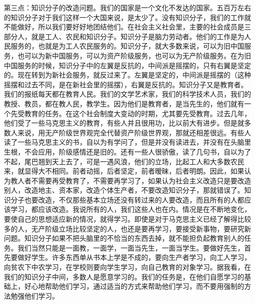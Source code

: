 第三点：知识分子的改造问题。我们的国家是一个文化不发达的国家。五百万左右的知识分子对于我们这样一个大国来说，是太少了。没有知识分子，我们的工作就不能做好，所以我们要好好地团结他们。在社会主义社会里，主要的社会成员是三部分人，就是工人、农民和知识分子。知识分子是脑力劳动者。他们的工作是为人民服务的，也就是为工人农民服务的。知识分子，就大多数来说，可以为旧中国服务，也可以为新中国服务，可以为资产阶级服务，也可以为无产阶级服务。在为旧中国服务的时候，知识分子中的左翼是反抗的，中间派是摇摆的，只有右翼是坚定的。现在转到为新社会服务，就反过来了。左翼是坚定的，中间派是摇摆的（这种摇摆和过去不同，是在新社会里的摇摆），右翼是反抗的。知识分子又是教育者。我们的报纸每天都在教育人民。我们的文学艺术家，我们的科学技术人员，我们的教授、教员，都在教人民，教学生。因为他们是教育者，是当先生的，他们就有一个先受教育的任务。在这个社会制度大变动的时期，尤其要先受教育。过去几年，他们受了一些马克思主义的教育，有些人并且很用功，比以前大有进步。但是就多数人来说，用无产阶级世界观完全代替资产阶级世界观，那就还相差很远。有些人读了一些马克思主义的书，自以为有学问了，但是并没有读进去，并没有在头脑里生根，不会应用，阶级感情还是旧的。还有一些人很骄傲，读了几句书，自以为了不起，尾巴翘到天上去了，可是一遇风浪，他们的立场，比起工人和大多数农民来，就显得大不相同。前者动摇，后者坚定，前者暧昧，后者明朗。因此，如果认为教人者不需要再受教育了，不需要再学习了，如果认为社会主义改造只是要改造别人，改造地主、资本家，改造个体生产者，不要改造知识分子，那就错误了。知识分子也要改造，不仅那些基本立场还没有转过来的人要改造，而且所有的人都应该学习，都应该改造。我说所有的人，我们这些人也在内。情况是在不断地变化，要使自己的思想适应新的情况，就得学习。即使是对于马克思主义已经了解得比较多的人，无产阶级立场比较坚定的人，也还是要再学习，要接受新事物，要研究新问题。知识分子如果不把头脑里的不恰当的东西去掉，就不能担负起教育别人的任务。我们当然只能是一面教，一面学，一面当先生，一面当学生。要做好先生，首先要做好学生。许多东西单从书本上学是不成的，要向生产者学习，向工人学习，向贫农下中农学习，在学校则要向学生学习，向自己教育的对象学习。据我看，在我们的知识分子中间，多数人是愿意学习的。我们的任务是，在他们自愿学习的基础上，好心地帮助他们学习，通过适当的方式来帮助他们学习，而不要用强制的方法勉强他们学习。

